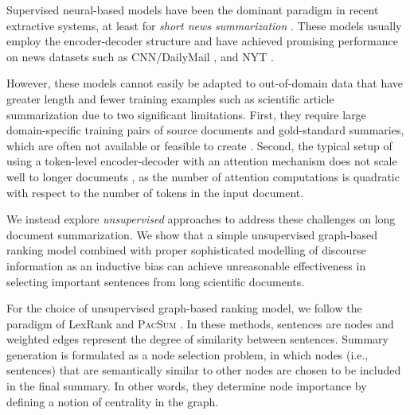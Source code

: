 \documentclass[11pt,a4paper]{article}
\begin{document}
Supervised neural-based models have been the dominant paradigm in recent extractive systems, at least for \textit{short news summarization} \citep{nallapati2017summarunner,dong2018banditsum,zhou2018neural,liu2019text,narayan2018ranking,zhang2019hibert}. These models usually employ the encoder-decoder structure and have achieved promising performance on news datasets such as CNN/DailyMail \citep{hermann2015teaching}, and NYT \citep{sandhaus2008new}. 

However, these models cannot easily be adapted to out-of-domain data that have greater length and fewer training examples such as scientific article summarization \citep{xiao2019extractive} due to two significant limitations. First, they require large domain-specific training pairs of source documents and gold-standard summaries, which are often not available or feasible to create \citep{zheng2019sentence}. Second, the typical setup of using a token-level encoder-decoder with an attention mechanism does not scale well to longer documents \cite{shao2017generating}, as the number of attention computations is quadratic with respect to the number of tokens in the input document.

We instead explore \emph{unsupervised} approaches to address these challenges on long document summarization. We show that a simple unsupervised graph-based ranking model combined with proper sophisticated modelling of discourse information as an inductive bias can achieve unreasonable effectiveness in selecting important sentences from long scientific documents. 

For the choice of unsupervised graph-based ranking model, we follow the paradigm of LexRank \citep{erkan2004lexrank} and \textsc{PacSum} \citep{zheng2019sentence}. In these methods, sentences are nodes and weighted edges represent the degree of similarity between sentences. Summary generation is formulated as a node selection problem, in which nodes (i.e., sentences) that are semantically similar to other nodes are chosen to be included in the final summary. In other words, they determine node importance by defining a notion of centrality in the graph.
\end{document}
